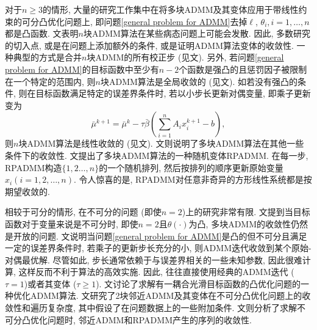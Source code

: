 \documentclass[UTF8,10.5pt,a4paper]{ctexart}
\theoremstyle{definition}
\theoremstyle{definition}
\begin{document}
\par 对于$n\ge3$的情形, 大量的研究工作集中在将多块ADMM及其变体应用于带线性约束的可分凸优化问题上, 即问题\eqref{general problem for ADMM}去掉$\ell$, $\theta_i,i=1,\ldots,n$都是凸函数. 文\cite{Chen2016The}表明$n$块ADMM算法在某些病态问题上可能会发散. 因此, 多数研究的切入点, 或是在问题上添加额外的条件, 或是证明ADMM算法变体的收敛性. 一种典型的方式是合并$n$块ADMM的所有校正步 (见文\cite{He2012Alternating,He2012On,He2015A}). 另外, 若问题\eqref{general problem for ADMM}的目标函数中至少有$n-2$个函数是强凸的且惩罚因子被限制在一个特定的范围内, 则$n$块ADMM算法是全局收敛的 (见文\cite{Cai2017On,Chen2013On,Han2013An,Li2015A,Lin2015On,Zhang2010Convergence}). 如若没有强凸的条件, 则在目标函数满足特定的误差界条件时, 若以小步长更新对偶变量, 即乘子更新变为
$$\bar\mu^{k+1}=\bar\mu^k-\tau\bar\beta\left(\sum\limits_{i=1}^nA_ix_i^{k+1}-b\right),$$
则$n$块ADMM算法是线性收敛的 (见文\cite{Hong2017On}). 文\cite{Lin2016Iteration,Lin2015Onthe}则说明了多块ADMM算法在其他一些条件下的收敛性. 文\cite{Sun2015On}提出了多块ADMM算法的一种随机变体RPADMM. 在每一步, RPADMM构造$\{1,2\ldots,n\}$的一个随机排列, 然后按排列的顺序更新原始变量$x_i(i=1,2,\ldots,n)$. 令人惊喜的是, RPADMM对任意非奇异的方形线性系统都是按期望收敛的.
\par 相较于可分的情形, 在不可分的问题 (即使$n=2$)上的研究非常有限. 文\cite{Hong2016COnvergence}提到当目标函数对于变量来说是不可分时, 即使$n=2$且$\theta(\cdot)$为凸, 多块ADMM的收敛性仍然是开放的问题. 文\cite{Hong2014A}说明当问题\eqref{general problem for ADMM}是凸的但不可分且满足一定的误差界条件时, 若乘子的更新步长充分的小, 则ADMM迭代收敛到某个原始-对偶最优解. 尽管如此, 步长通常依赖于与误差界相关的一些未知参数, 因此很难计算, 这样反而不利于算法的高效实施. 因此, 往往直接使用经典的ADMM迭代 ($\tau=1$)或者其变体 ($\tau\ge1$). 文\cite{Cui2016On}讨论了求解有一耦合光滑目标函数的凸优化问题的一种优化ADMM算法. 文\cite{Gao2017First}研究了2块邻近ADMM及其变体在不可分凸优化问题上的收敛性和遍历复杂度, 其中假设了在问题数据上的一些附加条件. 文\cite{Chen2019Extended}则分析了求解不可分凸优化问题时, 邻近ADMM和RPADMM产生的序列的收敛性.
\end{document}

